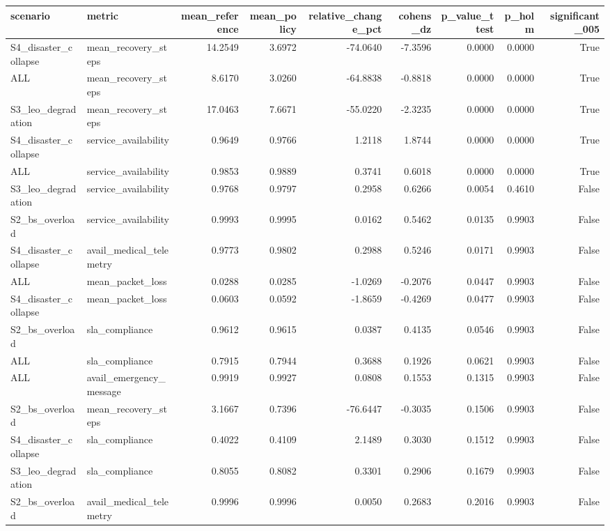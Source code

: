 \begin{tabular}{llrrrrrrr}
\toprule
scenario & metric & mean\_reference & mean\_policy & relative\_change\_pct & cohens\_dz & p\_value\_ttest & p\_holm & significant\_005 \\
\midrule
S4\_disaster\_collapse & mean\_recovery\_steps & 14.2549 & 3.6972 & -74.0640 & -7.3596 & 0.0000 & 0.0000 & True \\
ALL & mean\_recovery\_steps & 8.6170 & 3.0260 & -64.8838 & -0.8818 & 0.0000 & 0.0000 & True \\
S3\_leo\_degradation & mean\_recovery\_steps & 17.0463 & 7.6671 & -55.0220 & -2.3235 & 0.0000 & 0.0000 & True \\
S4\_disaster\_collapse & service\_availability & 0.9649 & 0.9766 & 1.2118 & 1.8744 & 0.0000 & 0.0000 & True \\
ALL & service\_availability & 0.9853 & 0.9889 & 0.3741 & 0.6018 & 0.0000 & 0.0000 & True \\
S3\_leo\_degradation & service\_availability & 0.9768 & 0.9797 & 0.2958 & 0.6266 & 0.0054 & 0.4610 & False \\
S2\_bs\_overload & service\_availability & 0.9993 & 0.9995 & 0.0162 & 0.5462 & 0.0135 & 0.9903 & False \\
S4\_disaster\_collapse & avail\_medical\_telemetry & 0.9773 & 0.9802 & 0.2988 & 0.5246 & 0.0171 & 0.9903 & False \\
ALL & mean\_packet\_loss & 0.0288 & 0.0285 & -1.0269 & -0.2076 & 0.0447 & 0.9903 & False \\
S4\_disaster\_collapse & mean\_packet\_loss & 0.0603 & 0.0592 & -1.8659 & -0.4269 & 0.0477 & 0.9903 & False \\
S2\_bs\_overload & sla\_compliance & 0.9612 & 0.9615 & 0.0387 & 0.4135 & 0.0546 & 0.9903 & False \\
ALL & sla\_compliance & 0.7915 & 0.7944 & 0.3688 & 0.1926 & 0.0621 & 0.9903 & False \\
ALL & avail\_emergency\_message & 0.9919 & 0.9927 & 0.0808 & 0.1553 & 0.1315 & 0.9903 & False \\
S2\_bs\_overload & mean\_recovery\_steps & 3.1667 & 0.7396 & -76.6447 & -0.3035 & 0.1506 & 0.9903 & False \\
S4\_disaster\_collapse & sla\_compliance & 0.4022 & 0.4109 & 2.1489 & 0.3030 & 0.1512 & 0.9903 & False \\
S3\_leo\_degradation & sla\_compliance & 0.8055 & 0.8082 & 0.3301 & 0.2906 & 0.1679 & 0.9903 & False \\
S2\_bs\_overload & avail\_medical\_telemetry & 0.9996 & 0.9996 & 0.0050 & 0.2683 & 0.2016 & 0.9903 & False \\

\end{tabular}
